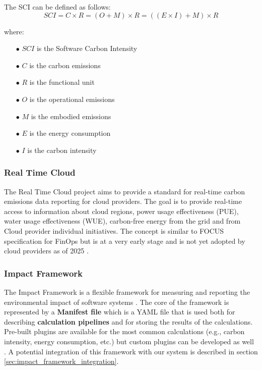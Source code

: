 The SCI can be defined as follows:
\[
SCI = C \times R = (O + M) \times R = ((E \times I) + M) \times R
\]

where:
\begin{itemize}[itemsep=0.2pt, topsep=1pt]
    \item[$\bullet$] $SCI$ is the Software Carbon Intensity
    \item[$\bullet$] $C$ is the carbon emissions
    \item[$\bullet$] $R$ is the functional unit
    \item[$\bullet$] $O$ is the operational emissions
    \item[$\bullet$] $M$ is the embodied emissions
    \item[$\bullet$] $E$ is the energy consumption
    \item[$\bullet$] $I$ is the carbon intensity
\end{itemize}

\subsubsection{Real Time Cloud}
\label{sec:real_time_cloud}

The Real Time Cloud project aims to provide a standard for real-time carbon emissions data reporting for cloud providers.
The goal is to provide real-time access to information about cloud regions, power usage effectiveness (PUE), water usage effectiveness (WUE), carbon-free energy from the grid and from Cloud provider individual initiatives.
The concept is similar to FOCUS specification for FinOps \cite{finops_focus_spec} but is at a very early stage and is not yet adopted by cloud providers as of 2025 \cite{real_time_cloud}.


\subsubsection{Impact Framework}
\label{sec:impact_framework}

The Impact Framework is a flexible framework for measuring and reporting the environmental impact of software systems \cite{impact_framework}.
The core of the framework is represented by a \textbf{Manifest file} which is a YAML file that is used both for describing \textbf{calculation pipelines} and for storing the results of the calculations.
Pre-built plugins are available for the most common calculations (e.g., carbon intensity, energy consumption, etc.) but custom plugins can be developed as well \cite{impact_framework}.
A potential integration of this framework with our system is described in section \ref{sec:impact_framework_integration}.

